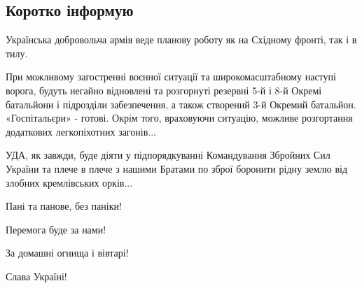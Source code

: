 
 
 
 
 
\subsection{Коротко інформую}
\label{sec:10_04_2021.fb.jarosh_dmitrij.1.ukraina_vojna_donbass_orki}

Українська добровольча армія веде планову роботу як на Східному фронті, так і в тилу.

При можливому загостренні воєнної ситуації та широкомасштабному наступі ворога,
будуть негайно відновлені та розгорнуті резервні 5-й і 8-й Окремі батальйони і
підрозділи забезпечення, а також створений 3-й Окремий батальйон.
«Госпітальєри» - готові. Окрім того, враховуючи ситуацію, можливе розгортання
додаткових легкопіхотних загонів... 

УДА, як завжди, буде діяти у підпорядкуванні Командування Збройних Сил України
та плече в плече з нашими Братами по зброї боронити рідну землю від злобних
кремлівських орків...

Пані та панове, без паніки! 

Перемога буде за нами!

За домашні огнища і вівтарі!

Слава Україні!
